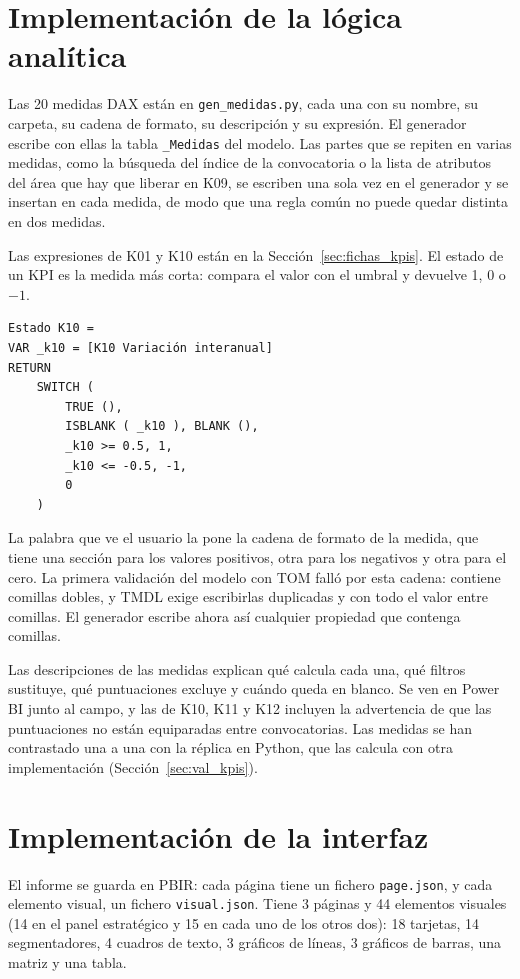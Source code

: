 \documentclass[12pt, a4paper, oneside]{report}
\begin{document}
\section{Implementación de la lógica analítica}
\label{sec:impl_dax}
Las 20 medidas DAX están en \texttt{gen\_medidas.py}, cada una con su nombre, su carpeta, su cadena de formato, su descripción y su expresión. El generador escribe con ellas la tabla \texttt{\_Medidas} del modelo. Las partes que se repiten en varias medidas, como la búsqueda del índice de la convocatoria o la lista de atributos del área que hay que liberar en K09, se escriben una sola vez en el generador y se insertan en cada medida, de modo que una regla común no puede quedar distinta en dos medidas.

Las expresiones de K01 y K10 están en la Sección~\ref{sec:fichas_kpis}. El estado de un KPI es la medida más corta: compara el valor con el umbral y devuelve 1, 0 o $-1$.

\par\vspace{2ex}\noindent\begin{minipage}{\textwidth}\small{}
\begin{verbatim}
Estado K10 =
VAR _k10 = [K10 Variación interanual]
RETURN
    SWITCH (
        TRUE (),
        ISBLANK ( _k10 ), BLANK (),
        _k10 >= 0.5, 1,
        _k10 <= -0.5, -1,
        0
    )
\end{verbatim}
\end{minipage}\par\vspace{2.5ex}

La palabra que ve el usuario la pone la cadena de formato de la medida, que tiene una sección para los valores positivos, otra para los negativos y otra para el cero. La primera validación del modelo con TOM falló por esta cadena: contiene comillas dobles, y TMDL exige escribirlas duplicadas y con todo el valor entre comillas. El generador escribe ahora así cualquier propiedad que contenga comillas.

Las descripciones de las medidas explican qué calcula cada una, qué filtros sustituye, qué puntuaciones excluye y cuándo queda en blanco. Se ven en Power BI junto al campo, y las de K10, K11 y K12 incluyen la advertencia de que las puntuaciones no están equiparadas entre convocatorias. Las medidas se han contrastado una a una con la réplica en Python, que las calcula con otra implementación (Sección~\ref{sec:val_kpis}).

\section{Implementación de la interfaz}
\label{sec:impl_interfaz}
El informe se guarda en PBIR: cada página tiene un fichero \texttt{page.json}, y cada elemento visual, un fichero \texttt{visual.json}. Tiene 3 páginas y 44 elementos visuales (14 en el panel estratégico y 15 en cada uno de los otros dos): 18 tarjetas, 14 segmentadores, 4 cuadros de texto, 3 gráficos de líneas, 3 gráficos de barras, una matriz y una tabla.
\end{document}
